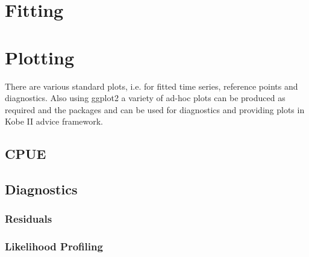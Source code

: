 \documentclass[shortnames,nojss,article]{jss}
\newenvironment{mylisting}
{\begin{list}{}{\setlength{\leftmargin}{1em}}\item\scriptsize\bfseries}
{\end{list}}
\begin{document}
\begin{mylisting}\begin{center}\begin{minipage}[H]{0.95\textwidth}\begin{shaded} 
\end{shaded}\end{minipage}\end{center}\end{mylisting}

\begin{mylisting}\begin{center}\begin{minipage}[H]{0.95\textwidth}\begin{shaded} 
\end{shaded}\end{minipage}\end{center}\end{mylisting}

\section{Fitting}

\section{Plotting}

There are various standard plots, i.e. for fitted time series, reference points and diagnostics. Also using ggplot2 a variety of ad-hoc plots can be produced as required and the packages  and  can be used for diagnostics and providing plots in Kobe II advice framework. 

\subsection{CPUE}

\subsection{Diagnostics}

\subsubsection{Residuals}
\subsubsection{Likelihood Profiling}
\end{document}
